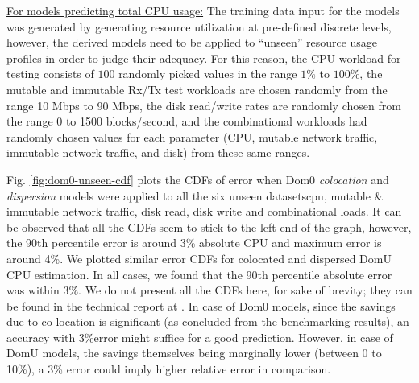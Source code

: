 \underline{For models predicting total CPU usage:}
The training data input for the models was generated
by generating resource utilization at pre-defined discrete 
levels, however, the derived models
need to be applied to ``unseen'' resource usage profiles
in order to judge their adequacy. For this reason, the
CPU workload for testing consists of $100$ randomly
picked values in the range $1\%$
to $100\%$, the mutable and immutable 
Rx/Tx test workloads
are chosen randomly from the range 10 Mbps to 90 Mbps, the
disk read/write rates are randomly chosen from the range
0 to 1500 blocks/second, and the combinational workloads 
had randomly chosen values for each parameter (CPU, mutable
network traffic, immutable network traffic,
and disk) from these same ranges.

Fig. \ref{fig:dom0-unseen-cdf} plots the CDFs of error when
Dom0 \emph{colocation} and \emph{dispersion} models were applied to all the
six unseen datasets\textemdash{}cpu, mutable \& immutable network traffic, disk read,
disk write and combinational loads. It can be observed that
all the CDFs seem to stick to the left end of the graph, however,
the 90th percentile
error is around 3\% absolute CPU and maximum error is around 4\%. 
We plotted similar error
CDFs for colocated and dispersed DomU CPU estimation. In 
all cases, we found that
the 90th percentile absolute error was within 3\%. We do
not present all the CDFs here, for sake of brevity; they can
be found in the technical report at \cite{affine-modeling-tech-report}.
In case of Dom0 models, 
since the savings due to co-location
is significant (as concluded from the benchmarking results), an
accuracy with 3\%error might suffice for a good prediction. However, in
case of DomU models, 
the savings themselves being marginally 
lower (between 0 to 10\%), a 3\% error could imply higher 
relative error in comparison. 

